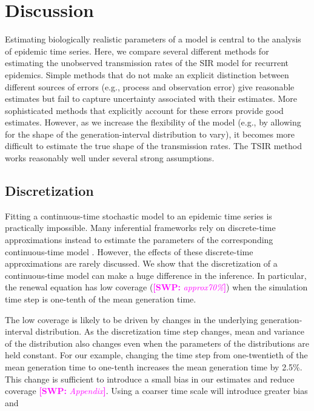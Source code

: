 \documentclass{article}
\newcommand{\comment}[3]{\textcolor{#1}{\textbf{[#2: }\textsl{#3}\textbf{]}}}
\newcommand{\swp}[1]{\comment{magenta}{SWP}{#1}}
\begin{document}
\section{Discussion}

Estimating biologically realistic parameters of a model is central to the analysis of epidemic time series.
Here, we compare several different methods for estimating the unobserved transmission rates of the SIR model for recurrent epidemics.
Simple methods that do not make an explicit distinction between different sources of errors (e.g., process and observation error) give reasonable estimates but fail to capture uncertainty associated with their estimates.
More sophisticated methods that explicitly account for these errors provide good estimates.
However, as we increase the flexibility of the model (e.g., by allowing for the shape of the generation-interval distribution to vary), it becomes more difficult to estimate the true shape of the transmission rates.
The TSIR method works reasonably well under several strong assumptions.

\subsection{Discretization}

Fitting a continuous-time stochastic model to an epidemic time series is practically impossible.
Many inferential frameworks rely on discrete-time approximations instead to estimate the parameters of the corresponding continuous-time model \citep{finkenstadt2002stochastic, king2015statistical, champredon2018two, li2018fitting}.
However, the effects of these discrete-time approximations are rarely discussed.
We show that the discretization of a continuous-time model can make a huge difference in the inference.
In particular, the renewal equation has low coverage (\swp{approx70\%}) when the simulation time step is one-tenth of the mean generation time.

The low coverage is likely to be driven by changes in the underlying generation-interval distribution.
As the discretization time step changes, mean and variance of the distribution also changes even when the parameters of the distributions are held constant.
For our example, changing the time step from one-twentieth of the mean generation time to one-tenth increases the mean generation time by 2.5\%.
This change is sufficient to introduce a small bias in our estimates and reduce coverage \swp{Appendix}.
Using a coarser time scale will introduce greater bias and 
\end{document}
